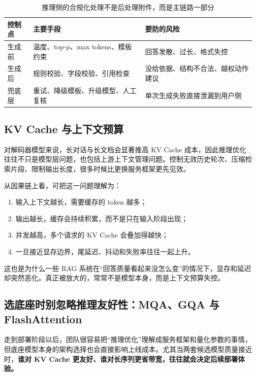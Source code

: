 \begin{table}[H]
\centering
\small
\begin{tabularx}{\textwidth}{>{\raggedright\arraybackslash}p{2.8cm}>{\raggedright\arraybackslash}p{3cm}>{\raggedright\arraybackslash}X}
\toprule
\textbf{控制点} & \textbf{主要手段} & \textbf{要防的风险} \\
\midrule
生成前 & 温度、top-p、max tokens、模板约束 & 回答发散、过长、格式失控 \\
生成后 & 规则校验、字段校验、引用检查 & 没给依据、结构不合法、越权动作建议 \\
兜底层 & 重试、降级模板、升级模型、人工复核 & 单次生成失败直接泄漏到用户侧 \\
\bottomrule
\end{tabularx}
\caption{推理侧的合规化处理不是后处理附件，而是主链路一部分}
\label{tab:inference-compliance}
\end{table}

\subsection{KV Cache 与上下文预算}
对解码器模型来说，长对话与长文档会显著推高 KV Cache 成本，因此推理优化往往不只是模型层问题，也包括上游上下文管理问题。控制无效历史轮次、压缩检索片段、限制输出长度，很多时候比更换服务框架更先见效。

从因果链上看，可把这一问题理解为：
\begin{enumerate}
  \item 输入上下文越长，需要缓存的 token 越多；
  \item 输出越长，缓存会持续积累，而不是只在输入阶段出现；
  \item 并发越高，多个请求的 KV Cache 会叠加得越快；
  \item 一旦接近显存边界，尾延迟、抖动和失败率往往一起上升。
\end{enumerate}

这也是为什么一些 RAG 系统在“回答质量看起来没怎么变”的情况下，显存和延迟却突然恶化。真正被放大的，常常不是模型本身，而是上下文预算失控。

\subsection{选底座时别忽略推理友好性：MQA、GQA 与 FlashAttention}
走到部署阶段以后，团队很容易把“推理优化”理解成服务框架和量化参数的事情，但底座模型本身的架构选择也会直接影响上线成本。尤其当两套候选模型质量接近时，\textbf{谁对 KV Cache 更友好、谁对长序列更省带宽，往往就会决定后续部署体验。}

